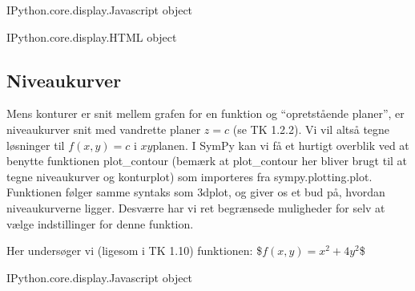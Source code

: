 \documentclass[letterpaper,10pt,english]{jupyterBook}
\begin{document}
\begin{sphinxVerbatim}[commandchars=\\\{\}]
\PYGZlt{}IPython.core.display.Javascript object\PYGZgt{}
\end{sphinxVerbatim}

\begin{sphinxVerbatim}[commandchars=\\\{\}]
\PYGZlt{}IPython.core.display.HTML object\PYGZgt{}
\end{sphinxVerbatim}


\subsection{Niveaukurver}
\label{\detokenize{notebooks/sympy/Notebook_FlereVar_analyse:niveaukurver}}
Mens konturer er snit mellem grafen for en funktion og “opretstående planer”, er niveaukurver snit med vandrette planer \(z=c\) (se TK 1.2.2). Vi vil altså tegne løsninger til \(f(x,y) = c\) i \(xy\)\sphinxhyphen{}planen. I SymPy kan vi få et hurtigt overblik ved at benytte funktionen plot\_contour (bemærk at plot\_contour her bliver brugt til at tegne niveaukurver og  konturplot) som importeres fra sympy.plotting.plot. Funktionen følger samme syntaks som 3dplot, og giver os et bud på, hvordan niveaukurverne ligger. Desværre har vi ret begrænsede muligheder for selv at vælge indstillinger for denne funktion.

Her undersøger vi (ligesom i TK 1.10) funktionen:
\$\( f(x, y) = x^2 + 4y^2 \)\$

\begin{sphinxVerbatim}[commandchars=\\\{\}]
   
          

        
\end{sphinxVerbatim}

\begin{sphinxVerbatim}[commandchars=\\\{\}]
\PYGZlt{}IPython.core.display.Javascript object\PYGZgt{}
\end{sphinxVerbatim}
\end{document}
